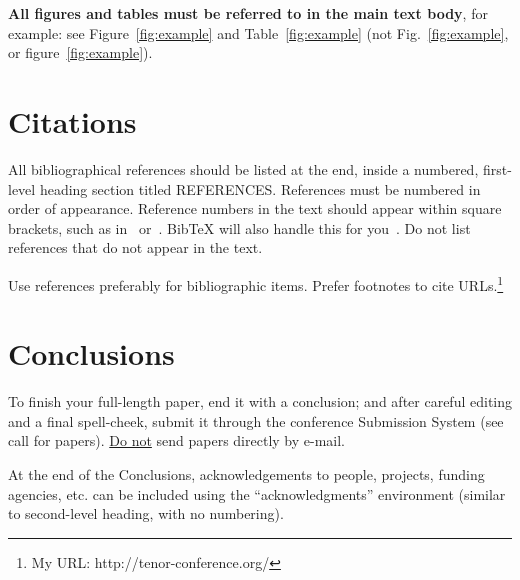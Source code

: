 \documentclass{article}
\begin{document}
\textbf{All figures and tables must be referred to in the main text body}, for example: see Figure~\ref{fig:example} and Table~\ref{fig:example} (not Fig.~\ref{fig:example}, or figure~\ref{fig:example}). 





\section{Citations}

All bibliographical references should be listed at the end, inside a numbered, first-level heading section titled REFERENCES.
References must be numbered in order of appearance. 
Reference numbers in the text should appear within square brackets, such as in~\cite{Someone:13} or~\cite{Someone:13,Someone:04,Someone:09}.
BibTeX will also handle this for you~\cite{ref:4,ref:online}.
Do not list references that do not appear in the text. 

Use references preferably for bibliographic items. Prefer footnotes to cite URLs.\footnote{My URL: http://tenor-conference.org/} 



\section{Conclusions}
To finish your full-length paper, end it with a conclusion; 
and after careful editing and a final spell-cheek,
submit it through the conference Submission System (see call for papers). 
\underline{Do not} send papers directly by e-mail.


\begin{acknowledgments}
At the end of the Conclusions, acknowledgements to people, projects, funding agencies, etc. can be included using the ``acknowledgments'' environment (similar to second-level heading, with no numbering).
\end{acknowledgments} 

\balance %


\end{document}
